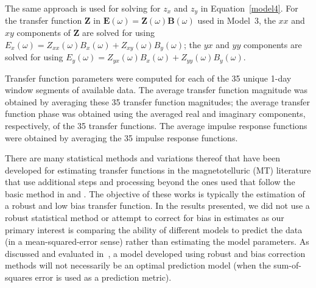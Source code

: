 \documentclass[draft,linenumbers]{agujournal2018}
\begin{document}
The same approach is used for solving for $z_x$ and $z_y$ in Equation~\ref{model4}. For the transfer function $\boldsymbol{Z}$ in $\mathbf{E}(\omega) = \boldsymbol{Z}(\omega)\mathbf{B}(\omega)$ used in Model~3, the $xx$ and $xy$ components of $\boldsymbol{Z}$ are solved for using $E_x(\omega) = Z_{xx}(\omega)B_x(\omega) + Z_{xy}(\omega)B_{y}(\omega)$; the $yx$ and $yy$ components are solved for using $E_y(\omega) = Z_{yx}(\omega)B_x(\omega) + Z_{yy}(\omega)B_y(\omega)$.



Transfer function parameters were computed for each of the 35 unique 1-day window segments of available data. The average transfer function magnitude was obtained by averaging these 35 transfer function magnitudes; the average transfer function phase was obtained using the averaged real and imaginary components, respectively, of the 35 transfer functions. The average impulse response functions were obtained by averaging the 35 impulse response functions. 

There are many statistical methods and variations thereof that have been developed for estimating transfer functions in the magnetotelluric (MT) literature that use additional steps and processing \citep{Egbert1986,Chave1987,Chave1989,Jones1989,Larsen1996,Egbert1997,Eisel2001,Chave2004,Chave2012,Chave2017} beyond the ones used that follow the basic method in \cite{Sims1971} and \cite{Simpson2005}. The objective of these works is typically the estimation of a robust and low bias transfer function. In the results presented, we did not use a robust statistical method or attempt to correct for bias in estimates as our primary interest is comparing the ability of different models to predict the data (in a mean-squared-error sense) rather than estimating the model parameters. As discussed and evaluated in~\cite{Weigel2017}, a model developed using robust and bias correction methods will not necessarily be an optimal prediction model (when the sum-of-squares error is used as a prediction metric).
\end{document}
